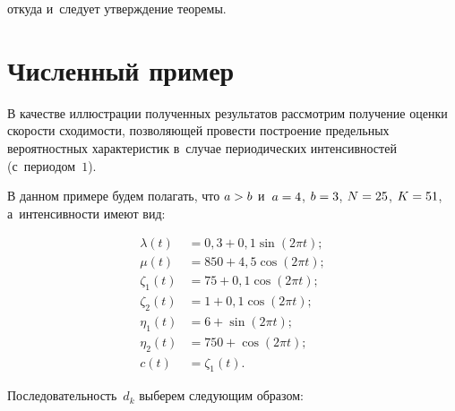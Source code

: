 \begin{multicols}{2}
\vspace*{-2pt}

\noindent
откуда и~следует утверж\-де\-ние тео\-ремы.

\vspace*{-9pt}

\section{Численный пример}

\vspace*{-1pt}

В качестве иллюстрации полученных результатов рас\-смот\-рим получение 
оцен\-ки ско\-рости схо\-ди\-мости, поз\-во\-ля\-ющей про\-вес\-ти по\-стро\-ение предельных 
вероятностных характеристик в~случае \mbox{периодических} интенсивностей (с~пе\-ри\-о\-дом~$1$).

В данном примере будем полагать, что $a \hm> b$ и~$a \hm= 4$, $b \hm= 3$, $N \hm= 25$, $K\hm=51$, 
а~интен\-сив\-ности имеют вид:

\vspace*{-8pt}

\noindent
\begin{align*}
\lambda(t) &= 0{,}3 + 0{,}1\sin(2\pi t);
\\
\mu(t) &= 850 + 4{,}5\cos(2\pi t);
\\
\zeta_1(t) &= 75 + 0{,}1\cos(2\pi t);
\\
\zeta_2(t) &= 1 + 0{,}1\cos(2\pi t);
\\
\eta_1(t) &= 6 + \sin(2\pi t);
\\
\eta_2(t) &= 750 + \cos(2\pi t);
\\
c(t) &=\zeta_1(t).
\end{align*}

\vspace*{-4pt}

Последовательность~$d_k$ выберем сле\-ду\-ющим обра\-зом:

\begin{figure*}[b] %
 \vspace*{1pt}
\begin{center}
   \mbox{%
\epsfxsize=162mm 
}
\end{center}
\vspace*{-9pt}
\label{fig1}
 \vspace*{9pt}
\begin{center}
   \mbox{%
\epsfxsize=162.346mm 
}
\end{center}
\vspace*{-9pt}
    \label{fig3} 
\end{figure*}


\end{multicols}

